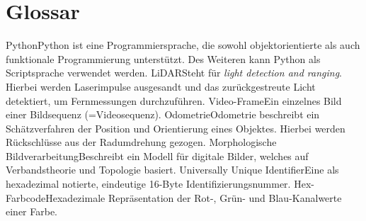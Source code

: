 {}
\chapter*[Glossar]{Glossar}

\begin{glossary}
    \gls{Python}{Python ist eine Programmiersprache, die sowohl objektorientierte als auch funktionale Programmierung unterstützt. Des Weiteren kann Python als Scriptsprache verwendet werden.}
    \gls{LiDAR}{Steht für \textit{light detection and ranging}. Hierbei werden Laserimpulse ausgesandt und das zurückgestreute Licht detektiert, um Fernmessungen durchzuführen.}
    \gls{Video-Frame}{Ein einzelnes Bild einer Bildsequenz (=Videosequenz).}
    \gls{Odometrie}{Odometrie beschreibt ein Schätzverfahren der Position und Orientierung eines Objektes. Hierbei werden Rückschlüsse aus der Radumdrehung gezogen.}
    \gls{Morphologische Bildverarbeitung}{Beschreibt ein Modell für digitale Bilder, welches auf Verbandstheorie und Topologie basiert. \cite{MM}}
    \gls{Universally Unique Identifier}{Eine als hexadezimal notierte, eindeutige 16-Byte Identifizierungsnummer.}
    \gls{Hex-Farbcode}{Hexadezimale Repräsentation der Rot-, Grün- und Blau-Kanalwerte einer Farbe.}
\end{glossary}
